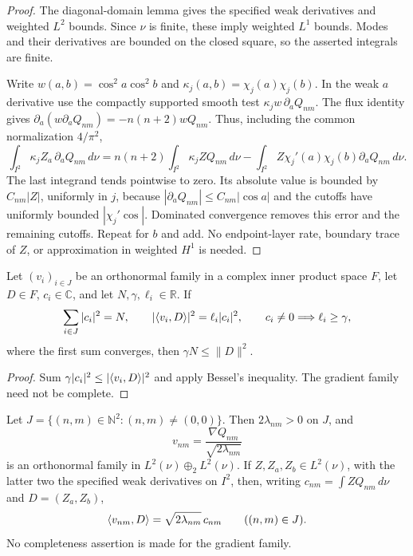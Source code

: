 \begin{proof}
\leanok
The diagonal-domain lemma gives the specified weak derivatives and weighted
$L^2$ bounds. Since $\nu$ is finite, these imply weighted $L^1$ bounds.
Modes and their derivatives are bounded on the closed square, so the
asserted integrals are finite.

Write $w(a,b)=\cos^2a\cos^2b$ and
$\kappa_j(a,b)=\chi_j(a)\chi_j(b)$.
In the weak $a$ derivative use the compactly supported smooth test
$\kappa_jw\,\partial_aQ_{nm}$.
The flux identity gives
$\partial_a(w\partial_aQ_{nm})=-n(n+2)wQ_{nm}$.
Thus, including the common normalization $4/\pi^2$,
\[
 \int_{I^2}\kappa_j Z_a\,\partial_aQ_{nm}\,d\nu
 =n(n+2)\int_{I^2}\kappa_j ZQ_{nm}\,d\nu
 -\int_{I^2}Z\chi_j'(a)\chi_j(b)\partial_aQ_{nm}\,d\nu .
\]
The last integrand tends pointwise to zero. Its absolute value is
bounded by $C_{nm}|Z|$, uniformly in $j$, because
$|\partial_aQ_{nm}|\le C_{nm}|\cos a|$ and the cutoffs have uniformly
bounded $|\chi_j'\cos|$.
Dominated convergence removes this error and the remaining cutoffs.
Repeat for $b$ and add. No endpoint-layer rate, boundary trace of $Z$,
or approximation in weighted $H^1$ is needed.
\end{proof}

\begin{lemma}
\label{lem:weak-mode-bessel}
\leanok
Let $(v_i)_{i\in J}$ be an orthonormal family in a complex inner product
space $F$, let $D\in F$, $c_i\in\mathbb C$, and let
$N,\gamma,\ell_i\in\mathbb R$. If
\[
 \sum_{i\in J}|c_i|^2=N,\qquad
 |\langle v_i,D\rangle|^2=\ell_i|c_i|^2,\qquad
 c_i\ne0\Longrightarrow\ell_i\ge\gamma,
\]
where the first sum converges, then $\gamma N\le\|D\|^2$.
\end{lemma}

\begin{proof}
\leanok
Sum $\gamma|c_i|^2\le|\langle v_i,D\rangle|^2$ and apply Bessel's inequality.
The gradient family need not be complete.
\end{proof}

\begin{lemma}
\label{lem:zonal-gradient-modes}
\leanok
Let $J=\{(n,m)\in\mathbb N^2:(n,m)\ne(0,0)\}$.
Then $2\lambda_{nm}>0$ on $J$, and
\[
 v_{nm}=\frac{\nabla Q_{nm}}{\sqrt{2\lambda_{nm}}}
\]
is an orthonormal family in $L^2(\nu)\oplus_2L^2(\nu)$.
If $Z,Z_a,Z_b\in L^2(\nu)$, with the latter two the specified weak
derivatives on $I^2$, then, writing
$c_{nm}=\int ZQ_{nm}\,d\nu$ and $D=(Z_a,Z_b)$,
\[
 \langle v_{nm},D\rangle=\sqrt{2\lambda_{nm}}\,c_{nm}\qquad((n,m)\in J).
\]
No completeness assertion is made for the gradient family.
\end{lemma}

